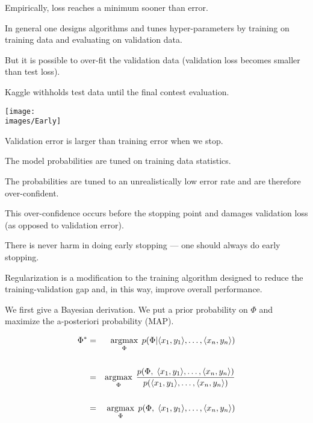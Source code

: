 {\vfill
Empirically, loss reaches a minimum sooner than error.


In general one designs algorithms and tunes hyper-parameters by training on training data and evaluating on validation data.

\vfill
But it is possible to over-fit the validation data (validation loss becomes smaller than test loss).

\vfill
Kaggle withholds test data until the final contest evaluation.



\centerline{\texttt{[image: \\images/Early]}}

\vfill
Validation error is larger than training error when we stop.

\vfill
The model probabilities are tuned on training data statistics.

\vfill
The probabilities are tuned to an unrealistically low error rate and are therefore over-confident.

\vfill
This over-confidence occurs before the stopping point and damages validation loss (as opposed to validation error).


There is never harm in doing early stopping --- one should always do early stopping.

\vfill
Regularization is a modification to the training algorithm designed to reduce the training-validation gap and, in this way, improve overall performance.


We first give a Bayesian derivation. We put a prior probability on $\Phi$ and maximize the a-posteriori probability (MAP).

\vfill
{\huge
\begin{eqnarray*}
\Phi^* & = & \operatorname*{argmax}_\Phi\;p(\Phi | {\mbox{$\langle x_1,y_1\rangle$}},\ldots,{\mbox{$\langle x_n,y_n\rangle$}}) \\
\\
 & = & \operatorname*{argmax}_\Phi\;\frac{p(\Phi,\; {\mbox{$\langle x_1,y_1\rangle$}},\ldots,{\mbox{$\langle x_n,y_n\rangle$}})}{p({\mbox{$\langle x_1,y_1\rangle$}},\ldots,{\mbox{$\langle x_n,y_n\rangle$}})} \\
\\
 & = & \operatorname*{argmax}_\Phi\;p(\Phi,\;{\mbox{$\langle x_1,y_1\rangle$}},\ldots,{\mbox{$\langle x_n,y_n\rangle$}})
 \end{eqnarray*}
}


}
